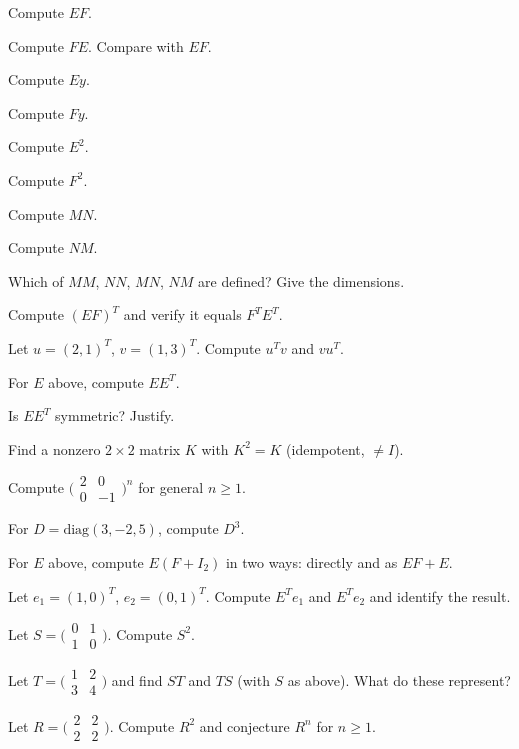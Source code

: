 \begin{problems}
    \item Compute $E F$.
    \item Compute $F E$. Compare with $E F$.
    \item Compute $E y$.
    \item Compute $F y$.
    \item Compute $E^{2}$.
    \item Compute $F^{2}$.
    \item Compute $M N$.
    \item Compute $N M$.
    \item Which of $M M$, $N N$, $M N$, $N M$ are defined? Give the dimensions.
    \item Compute $(E F)^{T}$ and verify it equals $F^{T} E^{T}$.
    \item Let $u = (2, 1)^{T}$, $v = (1, 3)^{T}$. Compute $u^{T} v$ and $v u^{T}$.
    \item For $E$ above, compute $E E^{T}$.
    \item Is $E E^{T}$ symmetric? Justify.
    \item Find a nonzero $2 \times 2$ matrix $K$ with $K^{2} = K$ (idempotent, $\neq I$).
    \item Compute $\bigl(\begin{smallmatrix} 2 & 0 \\ 0 & -1 \end{smallmatrix}\bigr)^{n}$ for general $n \ge 1$.
    \item For $D = \mathrm{diag}(3, -2, 5)$, compute $D^{3}$.
    \item For $E$ above, compute $E(F + I_{2})$ in two ways: directly and as $E F + E$.
    \item Let $e_{1} = (1, 0)^{T}$, $e_{2} = (0, 1)^{T}$. Compute $E^{T} e_{1}$ and $E^{T} e_{2}$ and identify the result.
    \item Let $S = \bigl(\begin{smallmatrix} 0 & 1 \\ 1 & 0 \end{smallmatrix}\bigr)$. Compute $S^{2}$.
    \item Let $T = \bigl(\begin{smallmatrix} 1 & 2 \\ 3 & 4 \end{smallmatrix}\bigr)$ and find $S T$ and $T S$ (with $S$ as above). What do these represent?
    \item Let $R = \bigl(\begin{smallmatrix} 2 & 2 \\ 2 & 2 \end{smallmatrix}\bigr)$. Compute $R^{2}$ and conjecture $R^{n}$ for $n \ge 1$.

\end{problems}
